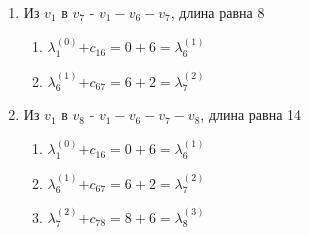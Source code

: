 \documentclass{article}
\newcommand\ld[2]{$\lambda^{(#1)}_{#2}$}
\begin{document}
\begin{enumerate}
    \item Из $v_1$ в $v_7$ - $v_1 - v_6 - v_7$, длина равна 8
    \begin{enumerate}
        \item \ld{0}{1}$+ c_{16} = 0 + 6 =$\ld{1}{6}
        \item \ld{1}{6}$+ c_{67} = 6 + 2 =$\ld{2}{7}
    \end{enumerate}

    \item Из $v_1$ в $v_8$ - $v_1 - v_6 - v_7 - v_8$, длина равна 14
    \begin{enumerate}
        \item \ld{0}{1}$+ c_{16} = 0 + 6 =$\ld{1}{6}
        \item \ld{1}{6}$+ c_{67} = 6 + 2 =$\ld{2}{7}
        \item \ld{2}{7}$+ c_{78} = 8 + 6 =$\ld{3}{8}
    \end{enumerate}
\end{enumerate}
\end{document}
